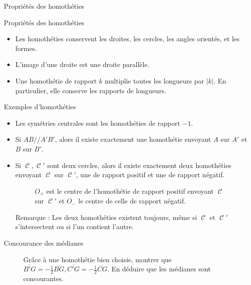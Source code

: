\documentclass[french]{beamer}
\DeclareMathOperator{\C}{\mathcal C}
\theoremstyle{plain}
\begin{document}
\begin{frame}{Propriétés des homothéties}
  \begin{exampleblock}{Propriétés des homothéties}
    \begin{itemize}
      \item Les homothéties conservent les droites, les cercles, les angles orientés, et les formes.
      \item L’image d’une droite est une droite parallèle.
      \item Une homothétie de rapport $ k $ multiplie toutes les longueurs par $ |k| $. En particulier, elle conserve les rapports de longueurs.
    \end{itemize}
  \end{exampleblock}
\end{frame}


\begin{frame}{Exemples d'homothéties}
  \begin{itemize}
    \item Les symétries centrales sont les homothéties de rapport $ -1 $.
    \item Si $ AB /\!/ A'B' $, alors il existe exactement une homothétie envoyant $A$ sur $A'$ et $ B $ sur $ B' $.
    \item Si $ \C, \C' $ sont deux cercles, alors il existe exactement deux homothéties envoyant $ \C $ sur $ \C' $, une de rapport positif et une de rapport négatif.
  \begin{figure}
    \centering
    \caption{$ O_+ $ est le centre de l'homothétie de rapport positif envoyant $ \C $ sur $ \C' $ et $ O_- $ le centre de celle de rapport négatif.}
  \end{figure}
  Remarque : Les deux homothéties existent toujours, même si $ \C $ et $ \C' $ s'intersectent ou si l'un contient l'autre.
  \end{itemize}
\end{frame}


\begin{frame}{Concourance des médianes}
  \begin{figure}
    \centering
    \caption{Grâce à une homothétie bien choisie, montrer que $ \overline{B'G} = -\frac 12\overline{BG}, \overline{C'G} = -\frac 12\overline{CG} $. En déduire que les médianes sont concourantes.}
  \end{figure}
\end{frame}
\end{document}
